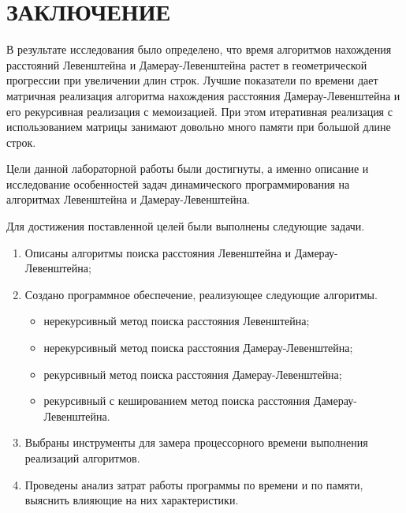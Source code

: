 \chapter*{\hfill{\centering  ЗАКЛЮЧЕНИЕ}\hfill}

В результате исследования было определено, что время алгоритмов нахождения расстояний Левенштейна и Дамерау-Левенштейна растет в геометрической прогрессии при увеличении длин строк.
Лучшие показатели по времени дает матричная реализация алгоритма нахождения расстояния Дамерау-Левенштейна и его рекурсивная реализация с мемоизацией.
При этом итеративная реализация с использованием матрицы занимают довольно много памяти при большой длине строк. 

Цели данной лабораторной работы были достигнуты, а именно описание и исследование особенностей задач динамического программирования на алгоритмах Левенштейна и Дамерау-Левенштейна.

Для достижения поставленной целей были выполнены следующие задачи.
\begin{enumerate}[label={\arabic*)}]
	\item Описаны алгоритмы поиска расстояния Левенштейна и \newline Дамерау-Левенштейна;
	\item Создано программное обеспечение, реализующее следующие алгоритмы.
	\begin{itemize}[label=---]
		\item нерекурсивный метод поиска расстояния Левенштейна;
		\item нерекурсивный метод поиска расстояния Дамерау-Левенштейна;
		\item рекурсивный метод поиска расстояния Дамерау-Левенштейна;
		\item рекурсивный с кешированием метод поиска расстояния Дамерау-Левенштейна.
	\end{itemize}
	\item Выбраны инструменты для замера процессорного времени выполнения реализаций алгоритмов.
	\item Проведены анализ затрат работы программы по времени и по памяти, выяснить влияющие на них характеристики. 
\end{enumerate}
